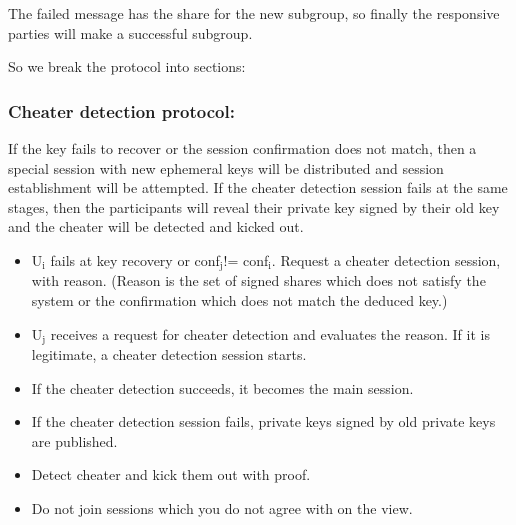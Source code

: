 \documentclass[11pt]{article}
\begin{document}
The failed message has the share for the new subgroup, so finally the responsive
parties will make a successful subgroup.

So we break the protocol into sections:

\subsubsection{Cheater detection protocol:}
\label{sec-8-2-1}

   If the key fails to recover or the session confirmation does not match, then a special session with new ephemeral keys will be distributed and session establishment will be attempted. If the cheater detection session fails
at the same stages, then the participants will reveal their private key signed by their old key and the cheater will be detected and kicked out.

\begin{itemize}
\item U$_{\text{i}}$ fails at key recovery or conf$_{\text{j}}$!= conf$_{\text{i}}$. Request a cheater detection session, with reason. (Reason is the set of signed shares which does not satisfy the system or the confirmation which does not match the deduced key.)
\item U$_{\text{j}}$ receives a request for cheater detection and evaluates the reason. If it is legitimate, a cheater detection session starts.
\item If the cheater detection succeeds, it becomes the main session.
\item If the cheater detection session fails, private keys signed by old private keys are published.
\item Detect cheater and kick them out with proof.
\item Do not join sessions which you do not agree with on the view.
\end{itemize}
\end{document}
